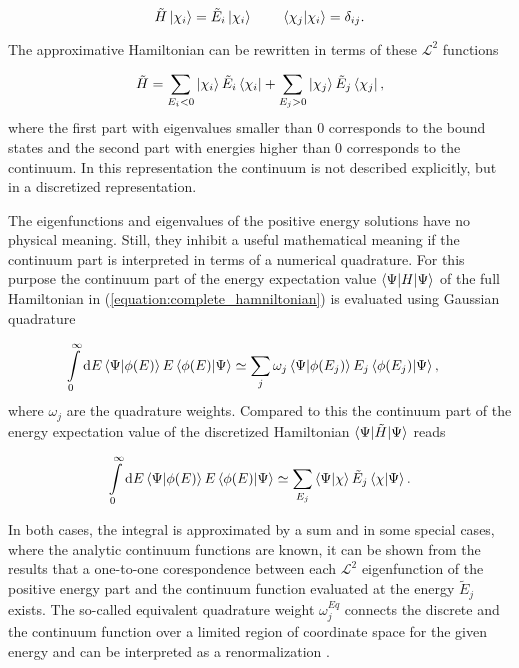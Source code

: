 \begin{equation}
  \tilde{H} \ket{\chi_i} = \tilde{E}_i \ket{\chi_i} \quad\quad  \,
  \braket{\chi_j|\chi_i} = \delta_{ij} .
\end{equation}

The approximative Hamiltonian can be rewritten in terms of these $\mathcal{L}^2$
functions

\begin{equation} \label{equation:discrete_hamiltonian}
  \tilde{H} = \sum\limits_{E_i<0} \ket{\chi_i} \tilde{E}_i \bra{\chi_i}
            + \sum\limits_{E_j>0} \ket{\chi_j} \tilde{E}_j \bra{\chi_j}   ,
\end{equation}
where the first part with eigenvalues smaller than 0 corresponds to the
bound states and the second part with energies higher than 0 corresponds to
the continuum. In this representation the continuum is not described explicitly,
but in a discretized representation.

The eigenfunctions and eigenvalues of the positive energy solutions have no physical
meaning. Still, they inhibit a useful
mathematical meaning if the continuum part is interpreted in terms of
a numerical quadrature.
For this purpose the continuum part of the energy expectation value
$\braket{\Psi| H | \Psi}$ of the full Hamiltonian in
(\ref{equation:complete_hamniltonian}) is evaluated using Gaussian quadrature

\begin{align}
  \int\limits_0^\infty \mathrm{d}E \braket{\Psi|\phi(E)} E \braket{\phi(E)|\Psi}
  &\simeq \sum\limits_j \omega_j \braket{\Psi|\phi(E_j)} E_j \braket{\phi(E_j)|\Psi} ,
\end{align}
where  $\omega_j$ are the quadrature weights.
Compared to this the continuum part of the energy expectation
value of the discretized Hamiltonian $\braket{\Psi| \tilde{H} | \Psi}$ reads

\begin{equation}
  \int\limits_0^\infty \mathrm{d}E \braket{\Psi|\phi(E)} E \braket{\phi(E)|\Psi}
  \simeq \sum\limits_{E_j}  \braket{\Psi|\chi} \tilde{E}_j \braket{\chi|\Psi}   .
\end{equation}

In both cases, the integral is approximated by a sum and in some special cases,
where the analytic continuum functions are known, it can be shown from the results
that a one-to-one corespondence between each $\mathcal{L}^2$
eigenfunction of the positive energy part and the continuum function evaluated
at the energy $\tilde{E}_j$ exists. The so-called equivalent quadrature
weight $\omega_j^{Eq}$ connects the discrete and
the continuum function over a limited region of coordinate space
for the given energy and can be interpreted
as a renormalization \cite{Reinhardt79}.

